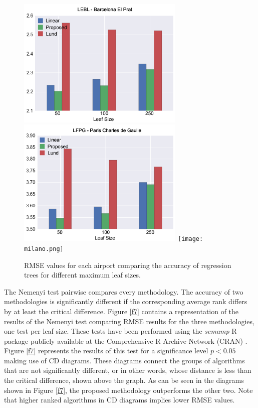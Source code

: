 \documentclass[times,twocolumn,final,authoryear]{elsarticle}
\begin{document}
\begin{figure}
  \includegraphics[width=8cm]{barcelona.png}
  \includegraphics[width=8cm]{charles.png}
  \texttt{[image: milano.png]}
\caption{RMSE values for each airport comparing the accuracy of regression trees for different maximum leaf sizes.}
\label{f6}
\end{figure}

The Nemenyi test pairwise compares every methodology. The accuracy of two methodologies is significantly different if the corresponding average rank differs by at least the critical difference. Figure \ref{f7} contains a representation of the results of the Nemenyi test comparing RMSE results for the three methodologies, one test per leaf size. These tests have been performed using the \textit{scmamp} R package publicly available at the Comprehensive R Archive Network (CRAN) \citep{Calvo2015}. Figure \ref{f7} represents the results of this test for a significance level $ p < 0.05 $ making use of CD diagrams.  These diagrams connect the groups of algorithms that are not significantly different, or in other words, whose distance is less than the critical difference, shown above the graph. As can be seen in the diagrams shown in Figure \ref{f7}, the proposed methodology outperforms the other two. Note that higher ranked algorithms in CD diagrams implies lower RMSE values.
\end{document}
